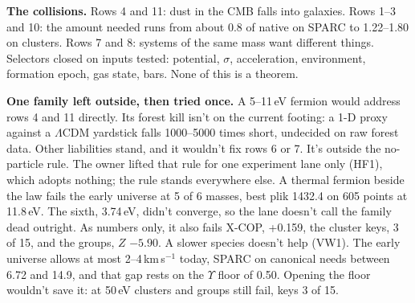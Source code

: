 \documentclass[10pt]{article}
\begin{document}
\textbf{The collisions.} Rows 4 and 11: dust in the CMB falls into galaxies. Rows 1--3 and 10: the amount needed runs from about 0.8 of native on SPARC to 1.22--1.80 on clusters. Rows 7 and 8: systems of the same mass want different things. Selectors closed on inputs tested: potential, $\sigma$, acceleration, environment, formation epoch, gas state, bars. None of this is a theorem.

\textbf{One family left outside, then tried once.} A 5--11\,eV fermion would address rows 4 and 11 directly. Its forest kill isn't on the current footing: a 1-D proxy against a $\Lambda$CDM yardstick falls 1000--5000 times short, undecided on raw forest data. Other liabilities stand, and it wouldn't fix rows 6 or 7. It's outside the no-particle rule. The owner lifted that rule for one experiment lane only (HF1), which adopts nothing; the rule stands everywhere else. A thermal fermion beside the law fails the early universe at 5 of 6 masses, best plik 1432.4 on 605 points at 11.8\,eV. The sixth, 3.74\,eV, didn't converge, so the lane doesn't call the family dead outright. As numbers only, it also fails X-COP, +0.159, the cluster keys, 3 of 15, and the groups, $Z$ $-5.90$. A slower species doesn't help (VW1). The early universe allows at most 2--4\,km\,s$^{-1}$ today, SPARC on canonical needs between 6.72 and 14.9, and that gap rests on the $\Upsilon$ floor of 0.50. Opening the floor wouldn't save it: at 50\,eV clusters and groups still fail, keys 3 of 15.
\end{document}
